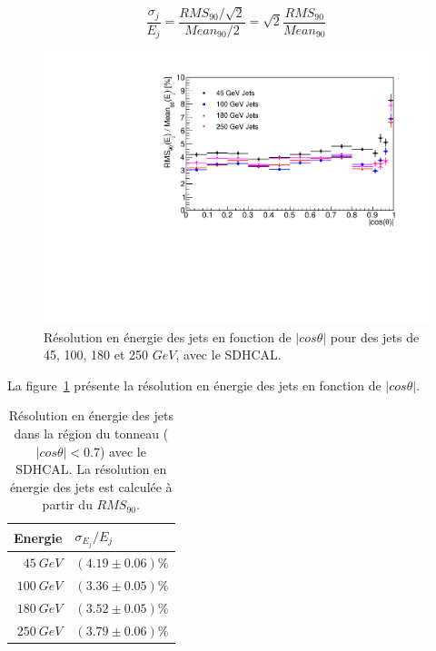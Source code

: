 \begin{equation}
\frac{\sigma_j}{E_j}=\frac{RMS_{90}/\sqrt{2}}{Mean_{90}/2}=\sqrt{2}\frac{RMS_{90}}{Mean_{90}}
\end{equation}

\begin{figure}[!ht]
  \centering
  \includegraphics[width=.8\textwidth]{ILD/figs/ResVsCosTheta.pdf}
  \caption{Résolution en énergie des jets en fonction de $|cos\theta|$ pour des jets de 45, 100, 180 et 250 $GeV$, avec le SDHCAL.}
  \label{fig:jet-energy-vs-costheta}
\end{figure}
La figure~\ref{fig:jet-energy-vs-costheta} présente la résolution en énergie des jets en fonction de $|cos\theta|$. 
\begin{table}[!ht]
  \begin{center}
    \begin{tabular}{r|l}
      \rowcolor{black!20!white} Energie & $\sigma_{E_j}/E_j$ \\
      \hline
      \rowcolor{black!5!white} $45 ~GeV$ & $(4.19\pm0.06)\%$\\
      \rowcolor{black!5!white} $100~GeV$ &$(3.36\pm0.05)\%$\\
      \rowcolor{black!5!white} $180~GeV$ &$(3.52\pm0.05)\%$\\
      \rowcolor{black!5!white} $250~GeV$ &$(3.79\pm0.06)\%$\\
    \end{tabular}
  \end{center}  
  \caption{Résolution en énergie des jets dans la région du tonneau ($|cos\theta|<0.7$) avec le SDHCAL. La résolution en énergie des jets est calculée à partir du $RMS_{90}$.}
  \label{tab.jetResultSDHCAL}
\end{table}
